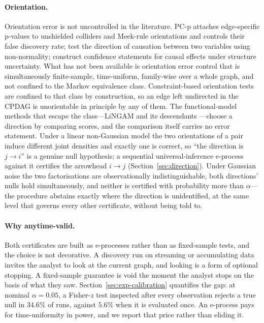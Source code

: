 \documentclass[pdflatex,sn-apa]{sn-jnl}
\theoremstyle{thmstyleone}%
\theoremstyle{thmstyletwo}%
\theoremstyle{thmstylethree}%
\begin{document}
\paragraph{Orientation.} Orientation error is not uncontrolled in the
literature. PC-p \citep{strobl2019estimating} attaches edge-specific p-values
to unshielded colliders and Meek-rule orientations and controls their false
discovery rate; \citet{shimizu2008use} test the direction of causation between
two variables using non-normality; \citet{strieder2023confidence} construct
confidence statements for causal effects under structure uncertainty. What has
not been available is orientation error control that is simultaneously
finite-sample, time-uniform, family-wise over a whole graph, and not confined
to the Markov equivalence class. Constraint-based orientation tests are
confined to that class by construction, so an edge left undirected in the
CPDAG is unorientable in principle by any of them. The functional-model methods that
escape the class---LiNGAM and its descendants
\citep{shimizu2006linear,shimizu2011directlingam,hyvarinen2013pairwise}---choose
a direction by comparing scores, and the comparison itself carries no error
statement. Under a linear non-Gaussian model the two orientations of a pair
induce different joint densities and exactly one is correct, so ``the
direction is $j \to i$'' is a genuine null hypothesis; a sequential
universal-inference e-process against it certifies the arrowhead $i \to j$
(Section~\ref{sec:direction}). Under Gaussian noise the two factorisations are
observationally indistinguishable, both directions' nulls hold simultaneously,
and neither is certified with probability more than $\alpha$---the procedure
abstains exactly where the direction is unidentified, at the same level that
governs every other certificate, without being told to.

\paragraph{Why anytime-valid.} Both certificates are built as e-processes
rather than as fixed-sample tests, and the choice is not decorative. A
discovery run on streaming or accumulating data invites the analyst to look at
the current graph, and looking is a form of optional stopping. A fixed-sample
guarantee is void the moment the analyst stops on the basis of what they saw.
Section~\ref{sec:exp-calibration} quantifies the gap: at nominal
$\alpha = 0.05$, a Fisher-$z$ test inspected after every observation rejects a
true null in $34.6\%$ of runs, against $5.6\%$ when it is evaluated once. An
e-process pays for time-uniformity in power, and we report that price rather
than eliding it.
\end{document}
